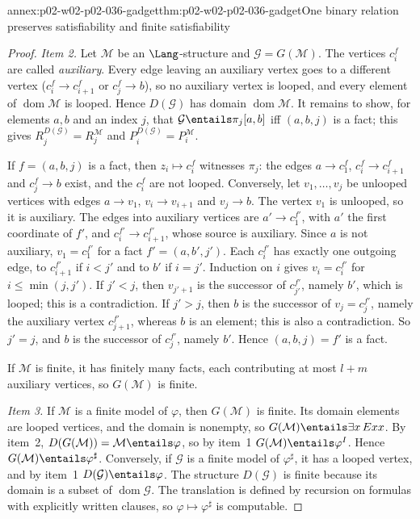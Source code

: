 \begin{annexitem}{annex:p02-w02-p02-036-gadget}{thm:p02-w02-p02-036-gadget}{One binary relation preserves satisfiability and finite satisfiability}
\begin{proof}
\emph{Item 2.}  Let \(\mathcal M\) be an \(\Lang\)-structure and
\(\mathcal G=G(\mathcal M)\).  The vertices \(c^f_i\) are called
\emph{auxiliary}.  Every edge leaving an auxiliary vertex goes to a different
vertex (\(c^f_i\to c^f_{i+1}\) or \(c^f_j\to b\)), so no auxiliary vertex is
looped, and every element of \(\operatorname{dom}\mathcal M\) is looped.  Hence
\(D(\mathcal G)\) has domain \(\operatorname{dom}\mathcal M\).  It remains to
show, for elements \(a,b\) and an index \(j\), that
\(\mathcal G\entails\pi_j[a,b]\) iff \((a,b,j)\) is a fact; this gives
\(R_j^{D(\mathcal G)}=R_j^{\mathcal M}\) and
\(P_i^{D(\mathcal G)}=P_i^{\mathcal M}\).

If \(f=(a,b,j)\) is a fact, then \(z_i\mapsto c^f_i\) witnesses \(\pi_j\):
the edges \(a\to c^f_1\), \(c^f_i\to c^f_{i+1}\) and \(c^f_j\to b\) exist, and
the \(c^f_i\) are not looped.  Conversely, let \(v_1,\ldots,v_j\) be unlooped
vertices with edges \(a\to v_1\), \(v_i\to v_{i+1}\) and \(v_j\to b\).  The
vertex \(v_1\) is unlooped, so it is auxiliary.  The edges into auxiliary vertices are
\(a'\to c^{f'}_1\), with \(a'\) the first coordinate of \(f'\), and
\(c^{f'}_{i}\to c^{f'}_{i+1}\), whose source is auxiliary.  Since \(a\) is not
auxiliary, \(v_1=c^{f'}_1\) for a fact \(f'=(a,b',j')\).  Each \(c^{f'}_i\) has
exactly one outgoing edge, to \(c^{f'}_{i+1}\) if \(i<j'\) and to \(b'\) if
\(i=j'\).  Induction on \(i\) gives \(v_i=c^{f'}_i\) for
\(i\leq\min(j,j')\).  If \(j'<j\), then \(v_{j'+1}\) is the successor of
\(c^{f'}_{j'}\), namely \(b'\), which is looped; this is a contradiction.  If
\(j'>j\), then \(b\) is the successor of \(v_j=c^{f'}_j\), namely the
auxiliary vertex \(c^{f'}_{j+1}\), whereas \(b\) is an element; this is
also a contradiction.  So \(j'=j\), and \(b\) is the successor of
\(c^{f'}_j\), namely \(b'\).  Hence \((a,b,j)=f'\) is a fact.

If \(\mathcal M\) is finite, it has finitely many facts, each contributing at
most \(l+m\) auxiliary vertices, so \(G(\mathcal M)\) is finite.

\emph{Item 3.}  If \(\mathcal M\) is a finite model of \(\varphi\), then
\(G(\mathcal M)\) is finite.  Its domain elements are looped vertices, and the
domain is nonempty, so \(G(\mathcal M)\entails\exists x\,Exx\).  By item~2,
\(D(G(\mathcal M))=\mathcal M\entails\varphi\), so by item~1
\(G(\mathcal M)\entails\varphi^{I}\).  Hence
\(G(\mathcal M)\entails\varphi^{\sharp}\).  Conversely, if \(\mathcal G\) is a
finite model of \(\varphi^{\sharp}\), it has a looped vertex, and by item~1
\(D(\mathcal G)\entails\varphi\).  The structure \(D(\mathcal G)\) is finite
because its domain is a subset of \(\operatorname{dom}\mathcal G\).  The
translation is defined by recursion on formulas with explicitly written
clauses, so \(\varphi\mapsto\varphi^{\sharp}\) is computable.


\end{proof}
\end{annexitem}
